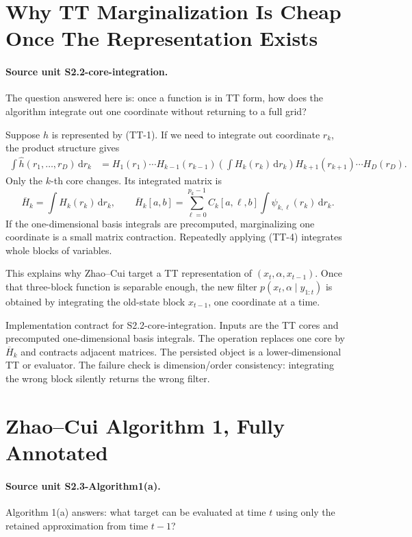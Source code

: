 \documentclass[11pt]{article}
\newcommand{\dd}{\,\mathrm d}
\begin{document}
\section{Why TT Marginalization Is Cheap Once The Representation Exists}

\paragraph{Source unit S2.2-core-integration.}
The question answered here is: once a function is in TT form, how does the
algorithm integrate out one coordinate without returning to a full grid?

Suppose \(h\) is represented by (TT-1).  If we need to integrate out coordinate
\(r_k\), the product structure gives
\[
\begin{aligned}
 \int \widehat h(r_1,\ldots,r_D)\dd r_k
 &=
 H_1(r_1)\cdots H_{k-1}(r_{k-1})
 \left(\int H_k(r_k)\dd r_k\right)
 H_{k+1}(r_{k+1})\cdots H_D(r_D).
\end{aligned}
\tag{TT-4}
\]
Only the \(k\)-th core changes.  Its integrated matrix is
\[
    \overline H_k
    =
    \int H_k(r_k)\dd r_k,\qquad
    \overline H_k[a,b]
    =
    \sum_{\ell=0}^{p_k-1} C_k[a,\ell,b]
    \int \psi_{k,\ell}(r_k)\dd r_k.
    \tag{TT-5}
\]
If the one-dimensional basis integrals are precomputed, marginalizing one
coordinate is a small matrix contraction.  Repeatedly applying (TT-4) integrates
whole blocks of variables.

This explains why Zhao--Cui target a TT representation of
\((x_t,\alpha,x_{t-1})\).  Once that three-block function is separable enough,
the new filter \(p(x_t,\alpha\mid y_{1:t})\) is obtained by integrating the
old-state block \(x_{t-1}\), one coordinate at a time.

Implementation contract for S2.2-core-integration.  Inputs are the TT cores and
precomputed one-dimensional basis integrals.  The operation replaces one core
by \(\overline H_k\) and contracts adjacent matrices.  The persisted object is a
lower-dimensional TT or evaluator.  The failure check is dimension/order
consistency: integrating the wrong block silently returns the wrong filter.

\section{Zhao--Cui Algorithm 1, Fully Annotated}

\paragraph{Source unit S2.3-Algorithm1(a).}
Algorithm 1(a) answers: what target can be evaluated at time \(t\) using only
the retained approximation from time \(t-1\)?
\end{document}
